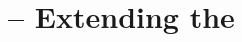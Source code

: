\documentclass[12pt]{report}
\begin{document}
\section{\lamC -- Extending the \lamA}
\label{lang_sec4}






\end{document}

